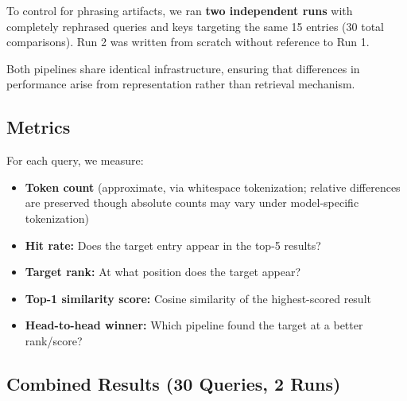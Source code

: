 \documentclass{article}
\begin{document}
To control for phrasing artifacts, we ran \textbf{two independent runs} with completely rephrased queries and keys targeting the same 15 entries (30 total comparisons). Run 2 was written from scratch without reference to Run 1. 

Both pipelines share identical infrastructure, ensuring that differences in performance arise from representation rather than retrieval mechanism.

\subsection{Metrics}

For each query, we measure:
\begin{itemize}
\item \textbf{Token count} (approximate, via whitespace tokenization; relative differences are preserved though absolute counts may vary under model-specific tokenization)
\item \textbf{Hit rate:} Does the target entry appear in the top-5 results?
\item \textbf{Target rank:} At what position does the target appear?
\item \textbf{Top-1 similarity score:} Cosine similarity of the highest-scored result
\item \textbf{Head-to-head winner:} Which pipeline found the target at a better rank/score?
\end{itemize}

\subsection{Combined Results (30 Queries, 2 Runs)}
\end{document}
